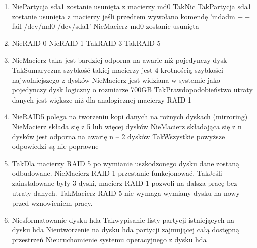 \begin{enumerate}
	\newpage
	\item {}%
	{Nie}{Partycja sda1 zostanie usunięta z macierzy md0}%
	{Tak}{Nic}%
	{Tak}{Partycja sda1 zostanie usunięta z macierzy jeśli przedtem wywołano komendę 'mdadm $ -- $fail /dev/md0 /dev/sda1'}%
	{Nie}{Macierz md0 zostanie usunięta}
	\item {}%
	{Nie}{RAID 0}%
	{Nie}{RAID 1}%
	{Tak}{RAID 3}%
	{Tak}{RAID 5}
	\item {}%
	{Nie}{Macierz taka jest bardziej odporna na awarie niż pojedynczy dysk}%
	{Tak}{Sumaryczna szybkość takiej macierzy jest 4-krotnością szybkości najwolniejszego z dysków}%
	{Nie}{Macierz jest widziana w systemie jako pojedynczy dysk logiczny o rozmiarze 700GB}%
	{Tak}{Prawdopodobieństwo utraty danych jest większe niż dla analogicznej macierzy RAID 1}
	\item {}%
	{Nie}{RAID5 polega na tworzeniu kopi danych na rożnych dyskach (mirroring)}%
	{Nie}{Macierz składa się z 5 lub więcej dysków}%
	{Nie}{Macierz składająca się z n dysków jest odporna na awarię n – 2 dysków}%
	{Tak}{Wszystkie powyższe odpowiedzi są nie poprawne}
	\item {}%
	{Tak}{Dla macierzy RAID 5 po wymianie uszkodzonego dysku dane zostaną odbudowane.}%
	{Nie}{Macierz RAID 1 przestanie funkcjonować.}%
	{Tak}{Jeśli zainstalowane były 3 dyski, macierz RAID 1 pozwoli na dalsza pracę bez utraty danych.}%
	{Tak}{Macierz RAID 5 nie wymaga wymiany dysku na nowy przed wznowieniem pracy.}
	\item {}%
	{Nie}{sformatowanie dysku hda}%
	{Tak}{wypisanie listy partycji istniejących na dysku hda}%
	{Nie}{utworzenie na dysku hda partycji zajmującej całą dostępną przestrzeń}%
	{Nie}{uruchomienie systemu operacyjnego z dysku hda}
	

\end{enumerate}
